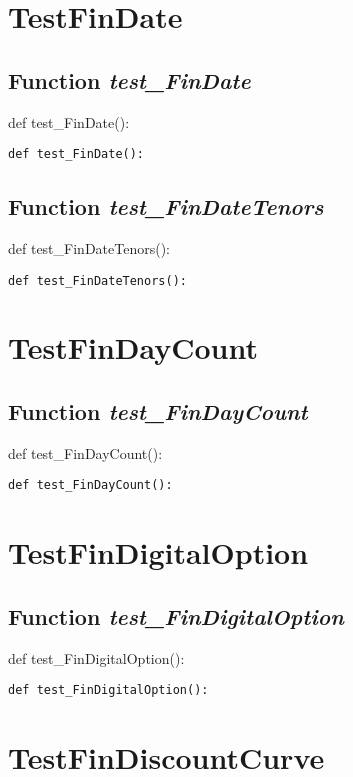 \documentclass[twoside,11pt]{book}
\begin{document}
\section{TestFinDate}

\subsection{Function {\it test\_FinDate}}
def test\_FinDate():

\begin{lstlisting}
def test_FinDate():
\end{lstlisting}

\subsection{Function {\it test\_FinDateTenors}}
def test\_FinDateTenors():

\begin{lstlisting}
def test_FinDateTenors():
\end{lstlisting}


\newpage
\section{TestFinDayCount}

\subsection{Function {\it test\_FinDayCount}}
def test\_FinDayCount():

\begin{lstlisting}
def test_FinDayCount():
\end{lstlisting}


\newpage
\section{TestFinDigitalOption}

\subsection{Function {\it test\_FinDigitalOption}}
def test\_FinDigitalOption():

\begin{lstlisting}
def test_FinDigitalOption():
\end{lstlisting}


\newpage
\section{TestFinDiscountCurve}
\end{document}
